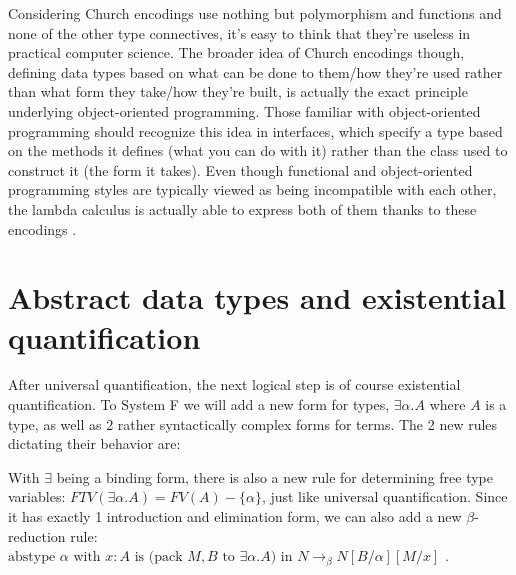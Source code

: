 \documentclass[12pt]{article}
\begin{document}
Considering Church encodings use nothing but polymorphism and functions and none of the other type connectives, it's easy to think that they're useless in practical computer science. The broader idea of Church encodings though, defining data types based on what can be done to them/how they're used rather than what form they take/how they're built, is actually the exact principle underlying object-oriented programming. Those familiar with object-oriented programming should recognize this idea in interfaces, which specify a type based on the methods it defines (what you can do with it) rather than the class used to construct it (the form it takes). Even though functional and object-oriented programming styles are typically viewed as being incompatible with each other, the lambda calculus is actually able to express both of them thanks to these encodings \cite{downen}.

\section{Abstract data types and existential quantification}

After universal quantification, the next logical step is of course existential quantification. To System F we will add a new form for types, $\exists \alpha. A$ where $A$ is a type, as well as 2 rather syntactically complex forms for terms. The 2 new rules dictating their behavior are:

\begin{prooftree}
\end{prooftree}

\begin{prooftree}
\end{prooftree}

With $\exists$ being a binding form, there is also a new rule for determining free type variables: $FTV(\exists \alpha. A) = FV(A) - \{\alpha\}$, just like universal quantification. Since it has exactly 1 introduction and elimination form, we can also add a new $\beta$-reduction rule: $\text{abstype } \alpha \text{ with } x: A \text{ is (pack } M, B \text{ to } \exists \alpha. A \text{) in } N \to_\beta N[B/\alpha][M/x]$ \cite{sorensen}.
\end{document}
